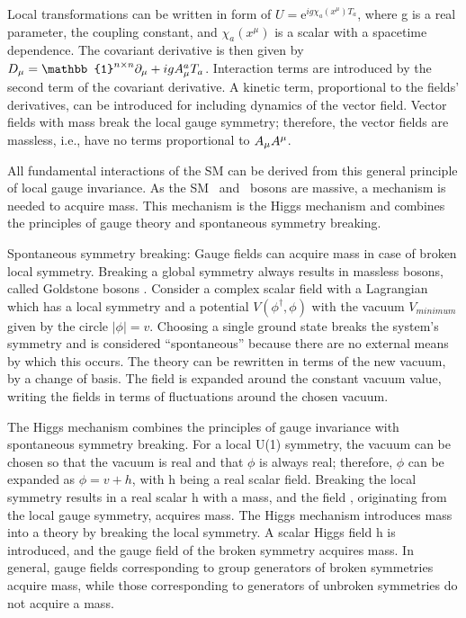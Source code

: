 Local transformations can be written in form of $U=\mathrm{e}^{i g \chi_{a}(x^{\mu}) T_{a}}$, where g is a real parameter, the coupling constant, and $\chi_{a}(x^{\mu})$ is a scalar with a spacetime dependence. The covariant derivative is then given by $D_{\mu}=\mathbb{1}^{n \times n} \partial_{\mu}+i g \amu^{a} T_{a}$. Interaction terms are introduced by the second term of the covariant derivative. A kinetic term, proportional to the fields' derivatives, can be introduced for including dynamics of the vector field. Vector fields with mass break the local gauge symmetry; therefore, the vector fields are massless, i.e., have no terms proportional to $A_{\mu} A^{\mu}$.

All fundamental interactions of the SM can be derived from this general principle of local gauge invariance. As the SM \PW\, and \PZ\, bosons are massive, a mechanism is needed to acquire mass. This mechanism is the Higgs mechanism and combines the principles of gauge theory and spontaneous symmetry breaking.

Spontaneous symmetry breaking: Gauge fields can acquire mass in case of broken local symmetry. Breaking a global symmetry always results in massless bosons, called Goldstone bosons \cite{Goldstone:1961eq, Goldstone:1962es}. Consider a complex scalar field with a Lagrangian which has a local \uone symmetry and a potential $V(\phi^{\dagger}, \phi)$ with the vacuum $V_{minimum}$ given by the circle $|\phi|=v$. Choosing a single ground state breaks the system's symmetry and is considered ``spontaneous'' because there are no external means by which this occurs. The theory can be rewritten in terms of the new vacuum, by a change of basis. The field is expanded around the constant vacuum value, writing the fields in terms of fluctuations around the chosen vacuum.

The Higgs mechanism combines the principles of gauge invariance with spontaneous symmetry breaking. For a local U(1) symmetry, the vacuum can be chosen so that the vacuum is real and that $\phi$ is always real; therefore, $\phi$ can be expanded as $\phi=v+h$, with h being a real scalar field. Breaking the local \uone symmetry results in a real scalar h with a mass, and the field \amu, originating from the local gauge symmetry, acquires mass. The Higgs mechanism introduces mass into a theory by breaking the local symmetry. A scalar Higgs field h is introduced, and the gauge field of the broken symmetry acquires mass. In general, gauge fields corresponding to group generators of broken symmetries acquire mass, while those corresponding to generators of unbroken symmetries do not acquire a mass.

